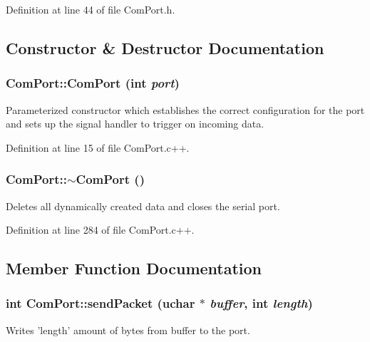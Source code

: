 Definition at line 44 of file ComPort.h.



\subsection{Constructor \& Destructor Documentation}
\hypertarget{class_com_port_af492fe14608a429a24d851f9f2f44a2e}{
\subsubsection[{ComPort}]{\setlength{\rightskip}{0pt plus 5cm}ComPort::ComPort (int {\em port})}}
\label{class_com_port_af492fe14608a429a24d851f9f2f44a2e}
Parameterized constructor which establishes the correct configuration for the port and sets up the signal handler to trigger on incoming data. 

Definition at line 15 of file ComPort.c++.

\hypertarget{class_com_port_a60f4557b68a559975a0404f77480e038}{
\subsubsection[{$\sim$ComPort}]{\setlength{\rightskip}{0pt plus 5cm}ComPort::$\sim$ComPort ()}}
\label{class_com_port_a60f4557b68a559975a0404f77480e038}
Deletes all dynamically created data and closes the serial port. 

Definition at line 284 of file ComPort.c++.



\subsection{Member Function Documentation}
\hypertarget{class_com_port_a60fac67ef62cd6ab7cc33cb23a0896e3}{
\subsubsection[{sendPacket}]{\setlength{\rightskip}{0pt plus 5cm}int ComPort::sendPacket (uchar $\ast$ {\em buffer}, \/  int {\em length})}}
\label{class_com_port_a60fac67ef62cd6ab7cc33cb23a0896e3}
Writes 'length' amount of bytes from buffer to the port.

